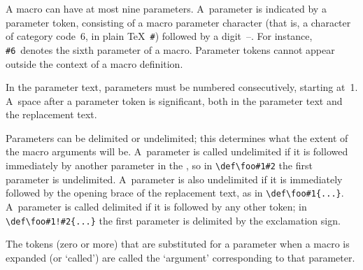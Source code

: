 \documentclass[letterpaper]{book}
\begin{document}
A macro can have at most nine parameters. 
A~parameter is indicated by a parameter token,
consisting of a macro parameter character
(that is, a character of category code~6,
in plain \TeX~\verb=#=) 
followed by a digit~--. 
For instance, \verb>#6>~denotes the sixth parameter of a macro.
Parameter tokens cannot appear outside the context
of a macro definition.

In the parameter text,
parameters must be numbered consecutively, starting at~1.
A~space after a parameter token is significant,
both in the parameter text and the replacement text.

Parameters can be delimited or undelimited; this determines what the
extent of the macro arguments will be. A~parameter
is called undelimited if it is followed immediately
by another parameter in the , so in
\verb+\def\foo#1#2+ the first parameter is undelimited.
A~parameter is also undelimited if it is immediately followed
by the opening brace of the replacement text, as in \verb+\def\foo#1{...}+.
A~parameter is called delimited if it is followed by any other token; 
in \verb+\def\foo#1!#2{...}+ the first parameter is delimited by the
exclamation sign.

The tokens (zero or more) that are substituted for
a parameter when a macro is expanded (or `called')
are called
the `argument' corresponding to that parameter.
\end{document}
